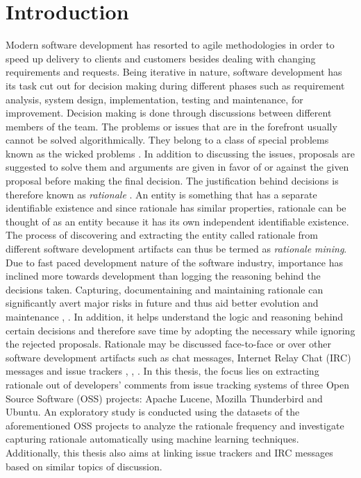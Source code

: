 \documentclass[a4paper,12pt,twoside]{report}
\begin{document}

\fancyhead{}
\pagestyle{fancy}
\fancyhead[LE]{\slshape \leftmark}
\fancyhead[RO]{\slshape \rightmark}
\headheight=15pt



\chapter{Introduction}
Modern software development has resorted to agile methodologies in order to speed up delivery to clients and customers besides dealing with changing requirements and requests. Being iterative in nature, software development has its task cut out for decision making during different phases such as requirement analysis, system design, implementation, testing and maintenance, for improvement. Decision making is done through discussions between different members of the team. The problems or issues that are in the forefront usually cannot be solved algorithmically. They belong to a class of special problems known as the wicked problems \cite{Rittel1973}. In addition to discussing the issues, proposals are suggested to solve them and arguments are given in favor of or against the given proposal before making the final decision. The justification behind decisions is therefore known as \textit{rationale} \cite{Dutoit2006}. An entity is something that has  a separate identifiable existence and since rationale has similar properties, rationale can be thought of as an entity because it has its own independent identifiable existence. The process of discovering and extracting the entity called rationale from different software development artifacts can thus be termed as \textit{rationale mining}.
\newline \newline
Due to fast paced development nature of the software industry, importance has inclined more towards development than logging the reasoning behind the decisions taken. Capturing, documentaining and maintaining rationale can significantly avert major risks in future and thus aid better evolution and maintenance \cite{Bruegge2009}, \cite{Dutoit2006}. In addition, it helps understand the logic and reasoning behind certain decisions and therefore save time by adopting the necessary while ignoring the rejected proposals. Rationale may be discussed face-to-face or over other software development artifacts such as chat messages, Internet Relay Chat (\acs{IRC}) messages and issue trackers \cite{Lata2016}, \cite{Nonnenmacher2017},  \cite{Panichella2014}.  
\newline \newline
In this thesis, the focus lies on extracting rationale out of developers' comments from issue tracking systems of three Open Source Software (\acs{OSS}) projects: Apache Lucene, Mozilla Thunderbird and Ubuntu. An exploratory study is conducted using the datasets of the aforementioned \acs{OSS} projects to analyze the rationale frequency and investigate capturing rationale automatically using machine learning techniques. Additionally, this thesis also aims at linking issue trackers and \acs{IRC} messages based on similar topics of discussion. 
\end{document}
